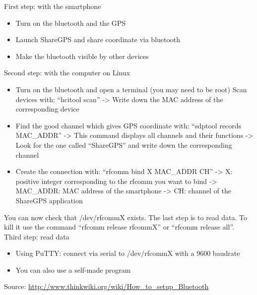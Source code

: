 First step: with the smartphone\\

\begin{itemize}
 \item Turn on the bluetooth and the GPS
 \item Launch ShareGPS and share coordinate via bluetooth
 \item Make the bluetooth visible by other devices
\end{itemize}

Second step: with the computer on Linux\\

\begin{itemize}
   \item  Turn on the bluetooth and open a terminal (you may need to be root)
   Scan devices with: ``hcitool scan''
   -> Write down the MAC address of the corresponding device
   \item Find the good channel which gives GPS coordinate with: ``sdptool records MAC\_ADDR''
   -> This command displays all channels and their functions
   -> Look for the one called ``ShareGPS'' and write down the corresponding channel
   \item Create the connection with: ``rfcomm bind X MAC\_ADDR CH''
    -> X: positive integer corresponding to the rfcomm you want to bind
    -> MAC\_ADDR: MAC address of the smartphone
    -> CH: channel of the ShareGPS application
\end{itemize}

You can now check that /dev/rfcommX exists. The last step is to read data.
To kill it use the command ``rfcomm release rfcommX'' or ``rfcomm release all''.\\

Third step: read data\\
\begin{itemize}
  \item Using PuTTY: connect via serial to /dev/rfcommX with a 9600 baudrate
  \item You can also use a self-made program
\end{itemize}

Source: \url{http://www.thinkwiki.org/wiki/How_to_setup_Bluetooth}
